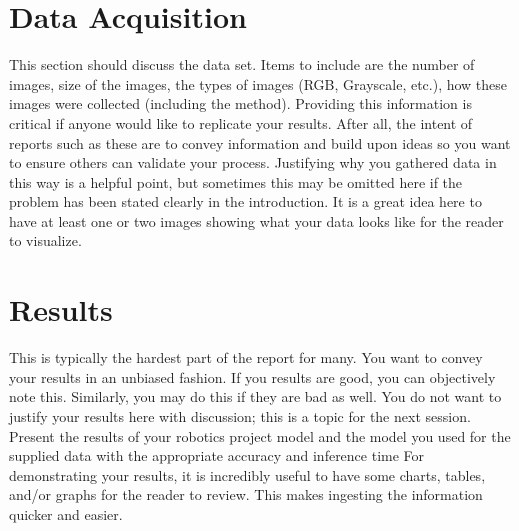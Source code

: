 \documentclass[10pt,journal,compsoc]{IEEEtran}
\begin{document}
%
%



%

\section{Data Acquisition}
This section should discuss the data set. Items to include are the number of images, size of the images, the types of images (RGB, Grayscale, etc.), how these images were collected (including the method). Providing this information is critical if anyone would like to replicate your results. After all, the intent of reports such as these are to convey information and build upon ideas so you want to ensure others can validate your process.
Justifying why you gathered data in this way is a helpful point, but sometimes this may be omitted here if the problem has been stated clearly in the introduction.
It is a great idea here to have at least one or two images showing what your data looks like for the reader to visualize.

\section{Results}
This is typically the hardest part of the report for many. You want to convey your results in an unbiased fashion. If you results are good, you can objectively note this. Similarly, you may do this if they are bad as well. You do not want to justify your results here with discussion; this is a topic for the next session. 
Present the results of your robotics project model and the model you used for the supplied data with the appropriate accuracy and inference time
For demonstrating your results, it is incredibly useful to have some charts, tables, and/or graphs for the reader to review. This makes ingesting the information quicker and easier.
\end{document}
